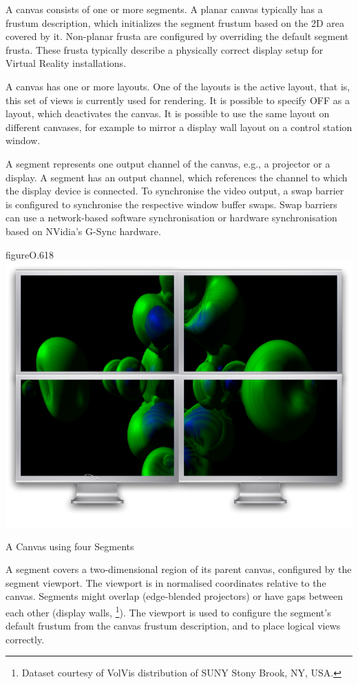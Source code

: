 A canvas consists of one or more segments. A planar canvas typically has a
frustum description, which initializes the segment frustum based on the 2D area
covered by it. Non-planar frusta are configured by overriding the default
segment frusta. These frusta typically describe a physically correct display
setup for Virtual Reality installations.

A canvas has one or more layouts. One of the layouts is the active layout, that
is, this set of views is currently used for rendering. It is possible to
specify \textsf{OFF} as a layout, which deactivates the canvas. It is possible
to use the same layout on different canvases, for example to mirror a display
wall layout on a control station window.

A \textsf{segment} represents one output channel of the canvas, e.g., a
projector or a display. A segment has an output channel, which references the
channel to which the display device is connected. To synchronise the video
output, a swap barrier is configured to synchronise the respective window
buffer swaps. Swap barriers can use a network-based software synchronisation or
hardware synchronisation based on NVidia's G-Sync hardware.

\begin{wrapfloat}{figure}{O}{.618\textwidth}
  \includegraphics[width=.618\textwidth]{images/canvas.pdf}
  {\caption{\label{fCanvas}A Canvas using four Segments}}
\end{wrapfloat}

A segment covers a two-dimensional region of its parent canvas, configured by
the segment viewport. The viewport is in normalised coordinates relative to the
canvas. Segments might overlap (edge-blended projectors) or have gaps between
each other (display walls, \footnote{Dataset courtesy of VolVis
distribution of SUNY Stony Brook, NY, USA.}). The viewport is used to configure
the segment's default frustum from the canvas frustum description, and to place
logical views correctly.

